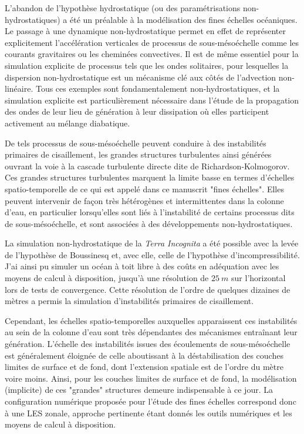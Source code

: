 L'abandon de l'hypothèse hydrostatique (ou des paramétrisations non-hydrostatiques) a été un préalable à la modélisation des fines échelles océaniques. Le passage à une dynamique non-hydrostatique permet en effet de représenter explicitement l'accélération verticales de processus de sous-mésoéchelle comme les courants gravitaires ou les cheminées convectives. Il est de même essentiel pour la simulation explicite de processus tels que les ondes solitaires, pour lesquelles la dispersion non-hydrostatique est un mécanisme clé aux côtés de l'advection non-linéaire. Tous ces exemples sont fondamentalement non-hydrostatiques, et la simulation explicite est particulièrement nécessaire dans l'étude de la propagation des ondes de leur lieu de génération à leur dissipation où elles participent activement au mélange diabatique. 

De tels processus de sous-mésoéchelle peuvent conduire à des instabilités primaires de cisaillement, les grandes structures turbulentes ainsi générées ouvrant la voie à la cascade turbulente directe dite de Richardson-Kolmogorov. Ces grandes structures turbulentes marquent la limite basse en termes d'échelles spatio-temporelle de ce qui est appelé dans ce manuscrit "fines échelles". Elles peuvent intervenir de façon très hétérogènes et intermittentes dans la colonne d'eau, en particulier lorsqu'elles sont liés à l'instabilité de certains processus dits de sous-mésoéchelle, et sont associées à des développements non-hydrostatiques.

La simulation non-hydrostatique de la \textit{Terra Incognita} a été possible avec la levée de l'hypothèse de Boussinesq et, avec elle, celle de l'hypothèse d'incompressibilité. J'ai ainsi pu simuler un océan à toit libre à des coûts en adéquation avec les moyens de calcul à disposition, jusqu'à une résolution de $25\ m$ sur l'horizontal lors de tests de convergence. Cette résolution de l'ordre de quelques dizaines de mètres a permis la simulation d'instabilités primaires de cisaillement.

Cependant, les échelles spatio-temporelles auxquelles apparaissent ces instabilités au sein de la colonne d'eau sont très dépendantes des mécanismes entraînant leur génération. L'échelle des instabilités issues des écoulements de sous-mésoéchelle est généralement éloignée de celle aboutissant à la déstabilisation des couches limites de surface et de fond, dont l'extension spatiale est de l'ordre du mètre voire moins.
Ainsi, pour les couches limites de surface et de fond, la modélisation (implicite) de ces "grandes" structures demeure indispensable à ce jour. La configuration numérique proposée pour l'étude des fines échelles correspond donc à une LES zonale, approche pertinente étant donnés les outils numériques et les moyens de calcul à disposition.\\

